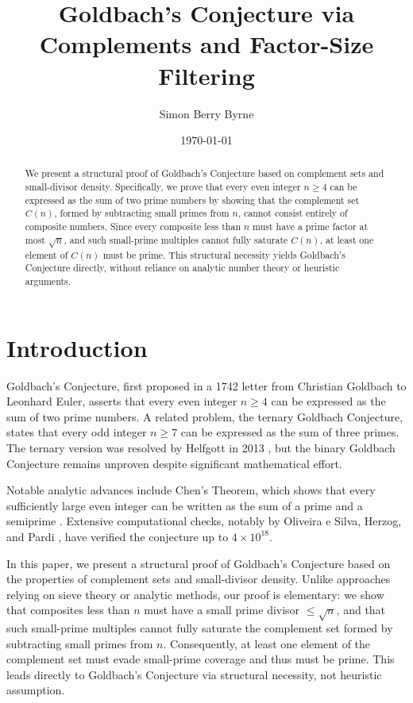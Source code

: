 \documentclass[11pt]{article}
\title{Goldbach's Conjecture via Complements and Factor-Size Filtering}
\author{Simon Berry Byrne}
\date{\today}
\begin{document}
	
	\maketitle

	\begin{abstract}
		We present a structural proof of Goldbach's Conjecture based on complement sets and small-divisor density. Specifically, we prove that every even integer \( n \geq 4 \) can be expressed as the sum of two prime numbers by showing that the complement set \( C(n) \), formed by subtracting small primes from \( n \), cannot consist entirely of composite numbers. Since every composite less than \( n \) must have a prime factor at most \( \sqrt{n} \), and such small-prime multiples cannot fully saturate \( C(n) \), at least one element of \( C(n) \) must be prime. This structural necessity yields Goldbach’s Conjecture directly, without reliance on analytic number theory or heuristic arguments.
	\end{abstract}

	
	
	\section{Introduction}
	
	Goldbach's Conjecture, first proposed in a 1742 letter from Christian Goldbach to Leonhard Euler, asserts that every even integer \( n \geq 4 \) can be expressed as the sum of two prime numbers. A related problem, the ternary Goldbach Conjecture, states that every odd integer \( n \geq 7 \) can be expressed as the sum of three primes. The ternary version was resolved by Helfgott in 2013 \cite{Helfgott2013}, but the binary Goldbach Conjecture remains unproven despite significant mathematical effort.
	
	Notable analytic advances include Chen's Theorem, which shows that every sufficiently large even integer can be written as the sum of a prime and a semiprime \cite{Chen1973}. Extensive computational checks, notably by Oliveira e Silva, Herzog, and Pardi \cite{Oliveira2014}, have verified the conjecture up to \( 4 \times 10^{18} \).
	
	In this paper, we present a structural proof of Goldbach's Conjecture based on the properties of complement sets and small-divisor density. Unlike approaches relying on sieve theory or analytic methods, our proof is elementary: we show that composites less than \( n \) must have a small prime divisor \( \leq \sqrt{n} \), and that such small-prime multiples cannot fully saturate the complement set formed by subtracting small primes from \( n \). Consequently, at least one element of the complement set must evade small-prime coverage and thus must be prime. This leads directly to Goldbach’s Conjecture via structural necessity, not heuristic assumption.
\end{document}

